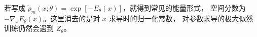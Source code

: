 若写成 $\tilde p_m(x;\theta)=\exp[-E_\theta(x)]$，就得到常见的能量形式，
空间分数为 $-\nabla_xE_\theta(x)$。这里消去的是对 $x$ 求导时的归一化常数，
对参数求导的极大似然训练仍然会遇到 $Z_\theta$。
